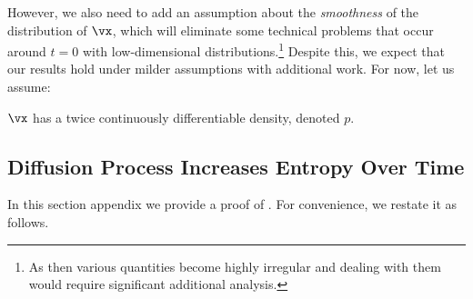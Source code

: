 \documentclass[../../book-main.tex]{subfiles}
\begin{document}
However, we also need to add an assumption about the \textit{smoothness} of the distribution of \(\vx\), which will eliminate some technical problems that occur around \(t = 0\) with low-dimensional distributions.\footnote{As then various quantities become highly irregular and dealing with them would require significant additional analysis.} Despite this, we expect that our results hold under milder assumptions with additional work. For now, let us assume:
\begin{assumption}\label{assumption:entropy_x_density}
    \(\vx\) has a twice continuously differentiable density, denoted \(p\).
\end{assumption}


\subsection{Diffusion Process Increases Entropy Over Time}\label{sub:diffusion_entropy_increases}

In this section appendix we provide a proof of . For convenience, we restate it as follows. 
\end{document}
